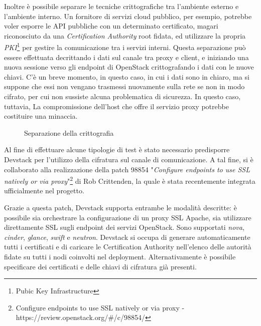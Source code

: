 \documentclass[../main.tex]{subfiles}
\begin{document}
Inoltre è possibile separare le tecniche crittografiche tra l'ambiente esterno e l'ambiente interno.
Un fornitore di servizi cloud pubblico, per esempio, potrebbe voler esporre le API pubbliche con un determinato certificato, magari riconosciuto da una \textit{Certification Authority} root fidata, ed utilizzare la propria \textit{PKI}\footnote{Pubic Key Infrastructure} per gestire la comunicazione tra i servizi interni.
Questa separazione può essere effettuata decrittando i dati sul canale tra proxy e client,
e iniziando una nuova sessione verso gli endpoint di OpenStack crittografando i dati con le nuove chiavi.
C'è un breve momento, in questo caso, in cui i dati sono in chiaro, ma si suppone che essi non vengano trasmessi nuovamente sulla rete se non in modo cifrato, per cui non sussiste alcuna problematica di sicurezza.
In questo caso, tuttavia,  La compromissione dell'host che offre il servizio proxy potrebbe costituire una minaccia.
\begin{figure}[H]
\centering
{}
\caption{Separazione della crittografia \cite{OpenStackSecurity}}\label{SSLSep}
\end{figure}

Al fine di effettuare alcune tipologie di test è stato necessario predisporre Devstack per l'utilizzo della cifratura sul canale di comunicazione.
A tal fine, si è collaborato alla realizzazione della patch 98854 "\textit{Configure endpoints to use SSL natively or via proxy}"\footnote{Configure endpoints to use SSL natively or via proxy
 - https://review.openstack.org/\#/c/98854/} di Rob Crittenden, la quale è stata recentemente integrata ufficialmente nel progetto.

Grazie a questa patch, Devstack supporta entrambe le modalità descritte: è possibile sia orchestrare la configurazione di un proxy SSL Apache, sia utilizzare direttamente SSL sugli endpoint dei servizi OpenStack. Sono supportati \textit{nova}, \textit{cinder}, \textit{glance}, \textit{swift} e \textit{neutron}.
Devstack si occupa di generare automaticamente tutti i certificati e di caricare le Certification Authority nell'elenco delle autorità fidate su tutti i nodi coinvolti nel deployment.
Alternativamente è possibile specificare dei certificati e delle chiavi di cifratura già presenti.
\end{document}
